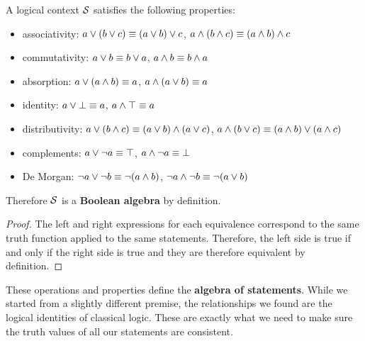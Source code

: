 \begin{mathSection}
		\begin{coro}\label{pm-vs-contextIsBoolean}
			A logical context $\mathcal{S}$ satisfies the following properties:
			\begin{itemize}
				\item associativity: $a \vee (b \vee c) \equiv (a \vee b) \vee c$, $a \wedge (b \wedge c) \equiv (a \wedge b) \wedge c$
				\item commutativity: $a \vee b \equiv b \vee a$, $a \wedge b \equiv b \wedge a$
				\item absorption: $a \vee (a \wedge b) \equiv a$, $a \wedge (a \vee b) \equiv a$
				\item identity: $a \vee \bot \equiv a
				$, $a \wedge \top \equiv a$
				\item distributivity: $a \vee (b \wedge c) \equiv (a \vee b) \wedge (a \vee c)$, $a \wedge (b \vee c) \equiv (a \wedge b) \vee (a \wedge c)$
				\item complements: $a \vee \neg a \equiv \top$, $a \wedge \neg a \equiv \bot$
				\item De Morgan: $\neg a \vee \neg b \equiv \neg (a \wedge b)$, $\neg a \wedge \neg b \equiv \neg (a \vee b)$
			\end{itemize}
			Therefore $\mathcal{S}$ is a \textbf{Boolean algebra} by definition.
		\end{coro}
		\begin{proof}
			The left and right expressions for each equivalence correspond to the same truth function applied to the same statements. Therefore, the left side is true if and only if the right side is true and they are therefore equivalent by definition.
		\end{proof}
	\end{mathSection}
	
	These operations and properties define the \textbf{algebra of statements}. While we started from a slightly different premise, the relationships we found are the logical identities of classical logic. These are exactly what we need to make sure the truth values of all our statements are consistent.
	
